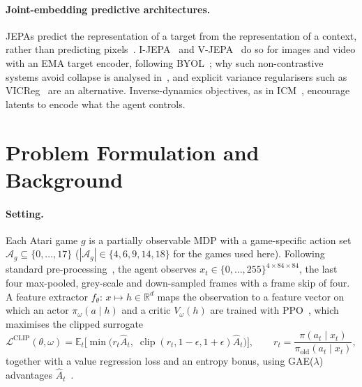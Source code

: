\documentclass[runningheads]{llncs}
\newcommand{\R}{\mathbb{R}}
\newcommand{\E}{\mathbb{E}}
\begin{document}
\paragraph{Joint-embedding predictive architectures.}
JEPAs predict the representation of a target from the representation of a context,
rather than predicting pixels~\cite{lecun2022path}. I-JEPA~\cite{assran2023ijepa} and
V-JEPA~\cite{bardes2024vjepa} do so for images and video with an EMA target encoder,
following BYOL~\cite{grill2020byol}; why such non-contrastive systems avoid collapse is
analysed in~\cite{chen2021simsiam,tian2021understanding}, and explicit variance
regularisers such as VICReg~\cite{bardes2022vicreg} are an alternative. Inverse-dynamics
objectives, as in ICM~\cite{pathak2017icm}, encourage latents to encode what the agent
controls.

\section{Problem Formulation and Background}
\label{sec:background}

\paragraph{Setting.}
Each Atari game $g$ is a partially observable MDP with a game-specific action set
$\mathcal{A}_g\subseteq\{0,\dots,17\}$ ($|\mathcal{A}_g|\in\{4,6,9,14,18\}$ for the
games used here). Following standard pre-processing~\cite{mnih2015human}, the agent
observes $x_t\in\{0,\dots,255\}^{4\times84\times84}$, the last four max-pooled, grey-scale
and down-sampled frames with a frame skip of four. A feature extractor
$f_\theta:\,x\mapsto h\in\R^{d}$ maps the observation to a feature vector on which an
actor $\pi_\omega(a\mid h)$ and a critic $V_\omega(h)$ are trained with
PPO~\cite{schulman2017ppo}, which maximises the clipped surrogate
\begin{equation}
  \mathcal{L}^{\text{CLIP}}(\theta,\omega)=\E_t\big[\min\big(r_t\hat A_t,\;
  \operatorname{clip}(r_t,1-\epsilon,1+\epsilon)\hat A_t\big)\big],\qquad
  r_t=\frac{\pi(a_t\mid x_t)}{\pi_{\text{old}}(a_t\mid x_t)},
\end{equation}
together with a value regression loss and an entropy bonus, using GAE($\lambda$)
advantages $\hat A_t$~\cite{schulman2016gae}.
\end{document}
